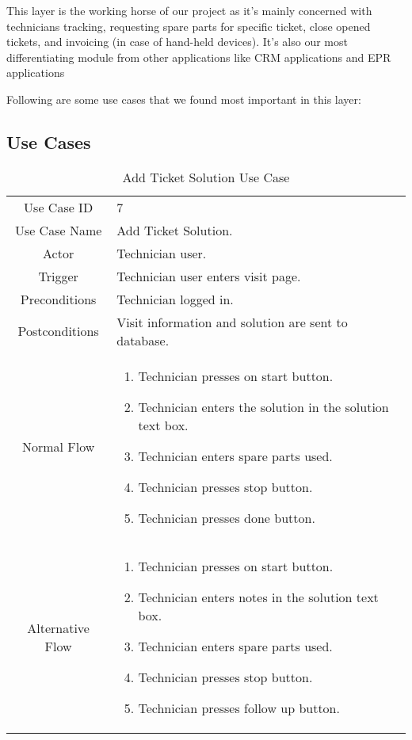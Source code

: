 This layer is the working horse of our project as it's mainly concerned with technicians tracking, requesting spare parts for specific ticket, close opened tickets, and invoicing (in case of hand-held devices). It's also our most differentiating module from other applications like CRM applications and EPR applications 

Following are some use cases that we found most important in this layer:
\subsection{Use Cases}
		\begin{table}[H]
			\centering
			\renewcommand{\arraystretch}{1.5}
			\begin{tabular}[t]{ c  m{10cm} }
				Use Case ID & 7  \\
				Use Case Name & Add Ticket Solution. \\
				Actor & Technician user. \\
				Trigger & Technician user enters visit page. \\
				Preconditions & Technician logged in. \\
				Postconditions & Visit information and solution are sent to database. \\
				Normal Flow &\begin{enumerate}
					\item Technician presses on start button.
					\item Technician enters the solution in the solution text box.
					\item Technician enters spare parts used.
					\item Technician presses stop button.
					\item Technician presses done button.
				\end{enumerate}\\
				Alternative Flow &\begin{enumerate}
					\item Technician presses on start button.
					\item Technician enters notes in the solution text box.
					\item Technician enters spare parts used.
					\item Technician presses stop button.
					\item Technician presses follow up button.
				\end{enumerate} \\
			\end{tabular}
			\caption{Add Ticket Solution Use Case}
			\renewcommand{\arraystretch}{1.0}
		\end{table}
	
